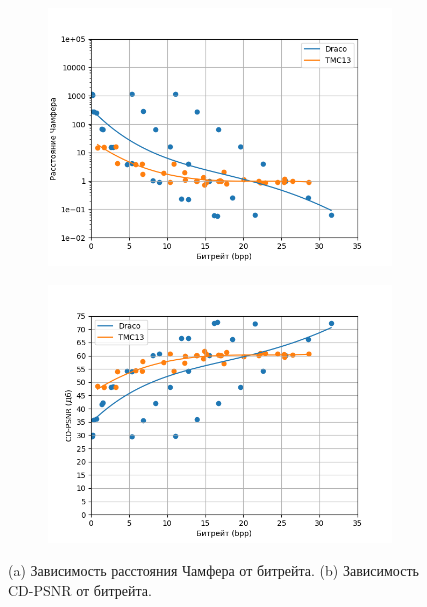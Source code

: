 \documentclass[a4paper,12pt]{extreport}
\begin{document}
\begin{figure}[H]
    \centering
    \begin{subfigure}{0.49\textwidth}
        \includegraphics[width=\linewidth]{assets/approx_cd_p2pt.png}
        \caption{}
    \end{subfigure}
    \begin{subfigure}{0.49\textwidth}
        \includegraphics[width=\linewidth]{assets/approx_cdpsnr_p2pt.png}
        \caption{}
    \end{subfigure}
    \caption{ (a) Зависимость расстояния Чамфера от битрейта. (b) Зависимость
    CD-PSNR от битрейта. }
    \label{img:pcc_arena_cd_bpp}
\end{figure}
\end{document}
